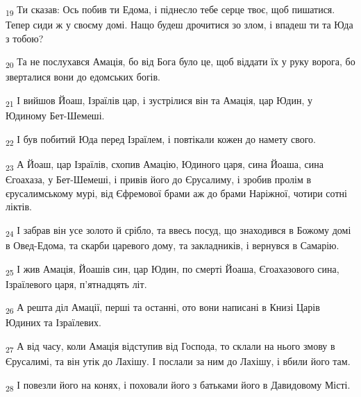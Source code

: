 \begin{tcolorbox}
\textsubscript{19} Ти сказав: Ось побив ти Едома, і піднесло тебе серце твоє, щоб пишатися. Тепер сиди ж у своєму домі. Нащо будеш дрочитися зо злом, і впадеш ти та Юда з тобою?
\end{tcolorbox}
\begin{tcolorbox}
\textsubscript{20} Та не послухався Амація, бо від Бога було це, щоб віддати їх у руку ворога, бо зверталися вони до едомських богів.
\end{tcolorbox}
\begin{tcolorbox}
\textsubscript{21} І вийшов Йоаш, Ізраїлів цар, і зустрілися він та Амація, цар Юдин, у Юдиному Бет-Шемеші.
\end{tcolorbox}
\begin{tcolorbox}
\textsubscript{22} І був побитий Юда перед Ізраїлем, і повтікали кожен до намету свого.
\end{tcolorbox}
\begin{tcolorbox}
\textsubscript{23} А Йоаш, цар Ізраїлів, схопив Амацію, Юдиного царя, сина Йоаша, сина Єгоахаза, у Бет-Шемеші, і привів його до Єрусалиму, і зробив пролім в єрусалимському мурі, від Єфремової брами аж до брами Наріжної, чотири сотні ліктів.
\end{tcolorbox}
\begin{tcolorbox}
\textsubscript{24} І забрав він усе золото й срібло, та ввесь посуд, що знаходився в Божому домі в Овед-Едома, та скарби царевого дому, та закладників, і вернувся в Самарію.
\end{tcolorbox}
\begin{tcolorbox}
\textsubscript{25} І жив Амація, Йоашів син, цар Юдин, по смерті Йоаша, Єгоахазового сина, Ізраїлевого царя, п'ятнадцять літ.
\end{tcolorbox}
\begin{tcolorbox}
\textsubscript{26} А решта діл Амації, перші та останні, ото вони написані в Книзі Царів Юдиних та Ізраїлевих.
\end{tcolorbox}
\begin{tcolorbox}
\textsubscript{27} А від часу, коли Амація відступив від Господа, то склали на нього змову в Єрусалимі, та він утік до Лахішу. І послали за ним до Лахішу, і вбили його там.
\end{tcolorbox}
\begin{tcolorbox}
\textsubscript{28} І повезли його на конях, і поховали його з батьками його в Давидовому Місті.
\end{tcolorbox}
